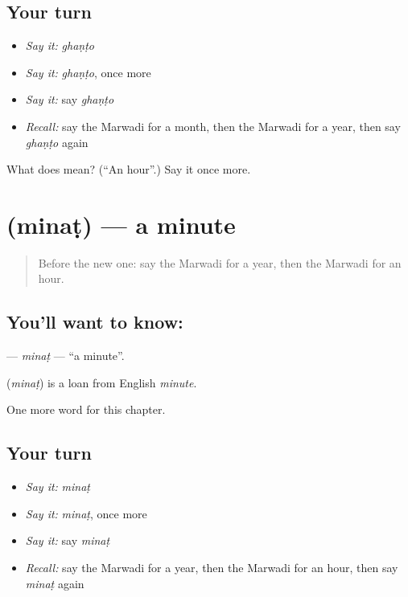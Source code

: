 \subsection*{Your turn}
\begin{itemize}
\raggedright
  \item \emph{Say it:} \emph{ghaṇṭo}
  \item \emph{Say it:} \emph{ghaṇṭo}, once more
  \item \emph{Say it:} say \emph{ghaṇṭo}
  \item \emph{Recall:} say the Marwadi for a month, then the Marwadi for a year, then say \emph{ghaṇṭo} again
\end{itemize}

\begin{tcolorbox}[breakable,colback=teal!4,colframe=teal!35!black,title={Before you move on}]
What does  mean? (\textquotedblleft{}An hour\textquotedblright{}.) Say it once more.
\end{tcolorbox}
\section[\texorpdfstring{\mw{मिनट} (minaṭ)}{मिनट (minaṭ)}]{ (minaṭ) — a minute}

\label{lesson:MW-C79-minat}



\begin{quote}
Before the new one: say the Marwadi for a year, then the Marwadi for an hour.
\end{quote}

\subsection*{You'll want to know: }
\textbf{} — \emph{minaṭ} — \textquotedblleft{}a minute\textquotedblright{}.

\begin{cousinweb}
\textbf{} (\emph{minaṭ}) is a loan from English \emph{minute}.
\end{cousinweb}

\begin{grammarlens}[title={What you've built}]
One more word for this chapter.
\end{grammarlens}

\subsection*{Your turn}
\begin{itemize}
\raggedright
  \item \emph{Say it:} \emph{minaṭ}
  \item \emph{Say it:} \emph{minaṭ}, once more
  \item \emph{Say it:} say \emph{minaṭ}
  \item \emph{Recall:} say the Marwadi for a year, then the Marwadi for an hour, then say \emph{minaṭ} again
\end{itemize}

